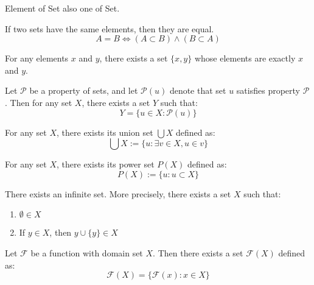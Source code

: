 \documentclass[11pt,lang=en]{elegantbook}
\begin{document}
\begin{remark}
  Element of Set also one of Set.
\end{remark}

\begin{axiom}
  If two sets have the same elements, then they are equal.
  \[
  A=B \iff (A \subset B) \land (B \subset A) 
  \]
\end{axiom}

\begin{axiom}
  For any elements $x$ and $y$, there exists a set $\{x,y\}$ whose elements are exactly $x$ and $y$.
\end{axiom}



\begin{axiom}
  Let $\mathcal{P} $ be a property of sets, and let $\mathcal{P}(u)$ denote that set $u$ satisfies property $\mathcal{P} $. Then for any set $X$, there exists a set $Y$ such that:
  \[
    Y = \{u \in X : \mathcal{P}(u)\}
  \]
\end{axiom}


\begin{axiom}
  For any set $X$, there exists its union set $\bigcup X$ defined as:
  \[
    \bigcup X := \{u : \exists v \in X, u \in v\}
  \]
\end{axiom}

\begin{axiom}
  For any set $X$, there exists its power set $P(X)$ defined as:
  \[
    P(X) := \{u : u \subset X\}
  \]
\end{axiom}

\begin{axiom}
  There exists an infinite set. More precisely, there exists a set $X$ such that:
  \begin{enumerate}
    \item $\emptyset \in X$
    \item If $y \in X$, then $y \cup \{y\} \in X$
  \end{enumerate}
\end{axiom}

\begin{axiom}
  Let $\mathcal{F}$ be a function with domain set $X$. Then there exists a set $\mathcal{F}(X)$ defined as:
  \[
    \mathcal{F}(X) = \{\mathcal{F}(x) : x \in X\}
  \]
\end{axiom}
\end{document}
